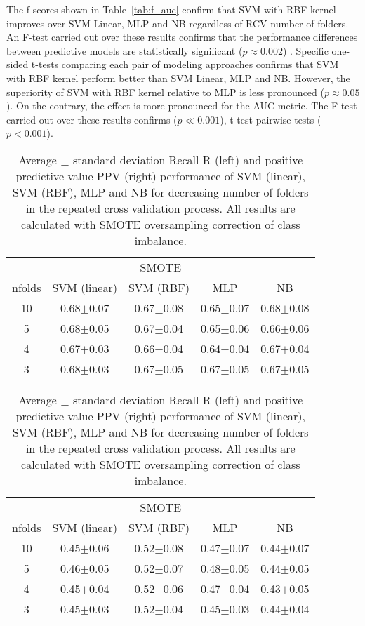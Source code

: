\documentclass[onesided]{article}\usepackage[]{graphicx}\usepackage[]{color}
\begin{document}
The f-scores shown in Table~\ref{tab:f_auc} confirm that SVM with RBF kernel improves over SVM Linear, MLP and NB regardless of RCV number of folders. An F-test carried out over these results confirms that the performance differences between predictive models are statistically significant  ($p\approx0.002$) . Specific one-sided t-tests comparing each pair of modeling approaches confirms that SVM with RBF kernel perform better than SVM Linear, MLP and NB. However, the superiority of SVM with RBF kernel relative to MLP is less pronounced ($p\approx0.05$). On the contrary, the effect is more pronounced for the AUC metric. The F-test carried out over these results confirms ($p\ll0.001$), t-test pairwise tests ($p<0.001$). 
\begin{table}[!htbp]
\centering
\footnotesize
\caption{Average $\pm$ standard deviation Recall R (left) and positive predictive value PPV (right) performance of SVM (linear), SVM (RBF), MLP and NB for decreasing number of folders in the repeated cross validation process. All results are calculated with SMOTE oversampling correction of class imbalance.}
\label{tab:r_ppv}
\begin{tabular}{*5c}
\toprule
  \multicolumn{5}{c}{SMOTE} \\
nfolds & SVM (linear) & SVM (RBF) & MLP & NB
\\
\midrule
10 & 0.68$\pm$0.07 & 0.67$\pm$0.08 & 0.65$\pm$0.07 & 0.68$\pm$0.08
\\
5 & 0.68$\pm$0.05 & 0.67$\pm$0.04 & 0.65$\pm$0.06 & 0.66$\pm$0.06
\\
4 & 0.67$\pm$0.03 & 0.66$\pm$0.04 & 0.64$\pm$0.04 & 0.67$\pm$0.04
\\
3 & 0.68$\pm$0.03 & 0.67$\pm$0.05 & 0.67$\pm$0.05 & 0.67$\pm$0.05
\\
\bottomrule
\end{tabular}
\quad
\begin{tabular}{*5c}
\toprule
  \multicolumn{5}{c}{SMOTE} \\
nfolds & SVM (linear) & SVM (RBF) & MLP & NB
\\
\midrule
10 & 0.45$\pm$0.06 & 0.52$\pm$0.08 & 0.47$\pm$0.07 & 0.44$\pm$0.07
\\
5 & 0.46$\pm$0.05 & 0.52$\pm$0.07 & 0.48$\pm$0.05 & 0.44$\pm$0.05
\\
4 & 0.45$\pm$0.04 & 0.52$\pm$0.06 & 0.47$\pm$0.04 & 0.43$\pm$0.05
\\
3 & 0.45$\pm$0.03 & 0.52$\pm$0.04 & 0.45$\pm$0.03 & 0.44$\pm$0.04
\\
\bottomrule
\end{tabular}
\end{table}
\end{document}
